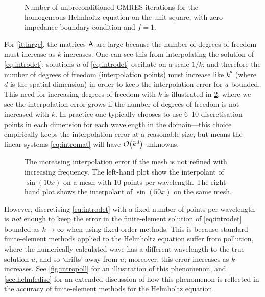         \begin{figure}[h]
      \centering
      
      \caption[Number of unpreconditioned GMRES iterations for the homogeneous Helmholtz equation]{Number of unpreconditioned GMRES iterations for the homogeneous Helmholtz equation on the unit square, with zero impedance boundary condition and $f=1$.\label{fig:GMRES}}
      \end{figure}
    
    For \cref{it:large}, the matrices $\mathsf{A}$ are large because the number of degrees of freedom must increase as $k$ increases. One can see this from interpolating the solution of \eqref{eq:introdet}; solutions $u$ of \eqref{eq:introdet} oscillate on a scale $1/k$, and therefore the number of degrees of freedom (interpolation points) must increase like $k^d$ (where $d$ is the spatial dimension) in order to keep the interpolation error for $u$ bounded. This need for increasing degrees of freedom with $k$ is illustrated in \cref{fig:introinterp}, where we see the interpolation error grows if the number of degrees of freedom is not increased with $k$. In practice one typically chooses to use 6--10 discretisation points in each dimension for each wavelength in the domain---this choice  empirically keeps the interpolation error at a reasonable size, but means the linear systems \eqref{eq:intromat} will have $\cO\mleft(k^d\mright)$ unknowns.

\begin{figure}[h]
    \centering
  \begin{subfigure}{0.45\textwidth}

  \end{subfigure}
    \begin{subfigure}{0.45\textwidth}

    \end{subfigure}
\caption[The increasing interpolation error if the mesh is not refined with increasing frequency.]{\label{fig:introinterp} The increasing interpolation error if the mesh is not refined with increasing frequency. The left-hand plot show the interpolant of $\sin(10x)$ on a mesh with 10 points per wavelength. The right-hand plot shows the interpolant of $\sin(50x)$ on the same mesh.}
\end{figure}

However, discretising \eqref{eq:introdet} with a fixed number of points per wavelength is \emph{not} enough to keep the error in the finite-element solution of \eqref{eq:introdet} bounded as $k\rightarrow \infty$ when using fixed-order methods. This is because standard-finite-element methods applied to the Helmholtz equation suffer from pollution, where the numerically calculated wave has a different wavelength to the true solution $u$, and so `drifts' away from $u$; moreover, this error increases as $k$ increases. See \cref{fig:intropoll} for an illustration of this phenomenon, and \cref{sec:helmfedisc} for an extended discussion of how this phenomenon is reflected in the accuracy of finite-element methods for the Helmholtz equation.

